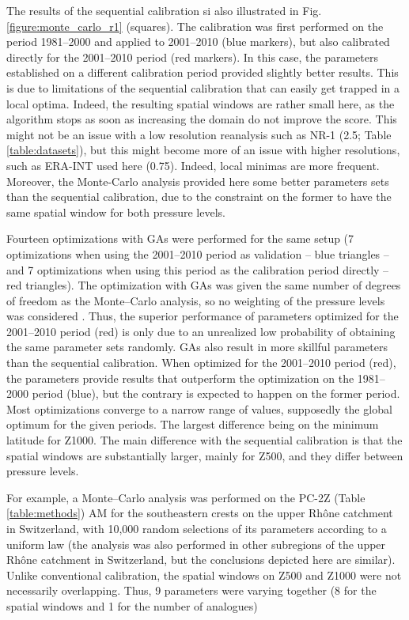 \documentclass[review]{elsarticle}
\begin{document}
The results of the sequential calibration si also illustrated in Fig. \ref{figure:monte_carlo_r1} (squares). The calibration was first performed on the period 1981--2000 and applied to 2001--2010 (blue markers), but also calibrated directly for the 2001--2010 period (red markers). In this case, the parameters established on a different calibration period provided slightly better results. This is due to limitations of the sequential calibration that can easily get trapped in a local optima. Indeed, the resulting spatial windows are rather small here, as the algorithm stops as soon as increasing the domain do not improve the score. This might not be an issue with a low resolution reanalysis such as NR-1 (2.5\degree; Table \ref{table:datasets}), but this might become more of an issue with higher resolutions, such as ERA-INT used here (0.75\degree). Indeed, local minimas are more frequent. Moreover, the Monte-Carlo analysis provided here some better parameters sets than the sequential calibration, due to the constraint on the former to have the same spatial window for both pressure levels. 

Fourteen optimizations with GAs were performed for the same setup (7 optimizations when using the 2001--2010 period as validation -- blue triangles -- and 7 optimizations when using this period as the calibration period directly -- red triangles). The optimization with GAs was given the same number of degrees of freedom as the Monte--Carlo analysis, so no weighting of the pressure levels was considered \citep[as in][]{Horton2018a}. Thus, the superior performance of parameters optimized for the 2001--2010 period (red) is only due to an unrealized low probability of obtaining the same parameter sets randomly. GAs also result in more skillful parameters than the sequential calibration. When optimized for the 2001--2010 period (red), the parameters provide results that outperform the optimization on the 1981--2000 period (blue), but the contrary is expected to happen on the former period. Most optimizations converge to a narrow range of values, supposedly the global optimum for the given periods. The largest difference being on the minimum latitude for Z1000. The main difference with the sequential calibration is that the spatial windows are substantially larger, mainly for Z500, and they differ between pressure levels. 





For example, a Monte--Carlo analysis was performed on the PC-2Z (Table \ref{table:methods}) AM for the southeastern crests on the upper Rh\^{o}ne catchment in Switzerland, with 10,000 random selections of its parameters according to a uniform law (the analysis was also performed in other subregions of the upper Rh\^{o}ne catchment in Switzerland, but the conclusions depicted here are similar). Unlike conventional calibration, the spatial windows on Z500 and Z1000 were not necessarily overlapping. Thus, 9 parameters were varying together (8 for the spatial windows and 1 for the number of analogues)
\end{document}
